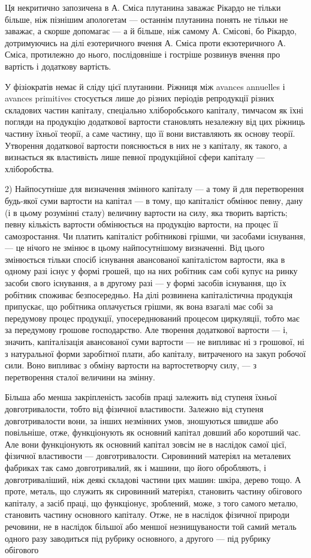 Ця некритично запозичена в А. Сміса плутанина заважає Рікардо
не тільки більше, ніж пізнішим апологетам — останнім плутанина понять
не тільки не заважає, а скорше допомагає — а й більше, ніж самому
А. Смісові, бо Рікардо, дотримуючись на ділі езотеричного вчення
А. Сміса проти екзотеричного А. Сміса, протилежно до нього, послідовніше
і гостріше розвинув вчення про вартість і додаткову вартість.

У фізіократів немає й сліду цієї плутанини. Ріжниця між avances
annuelles і avances primitives стосується лише до різних періодів репродукції
різних складових частин капіталу, спеціально хліборобського капіталу,
тимчасом як їхні погляди на продукцію додаткової вартости становлять
незалежну від цих ріжниць частину їхньої теорії, а саме частину,
що її вони виставляють як основу теорії. Утворення додаткової вартости
пояснюється в них не з капіталу, як такого, а визнається як властивість
лише певної продукційної сфери капіталу — хліборобства.

2) Найпосутніше для визначення змінного капіталу — а тому й для
перетворення будь-якої суми вартости на капітал — в тому, що капіталіст
обмінює певну, дану (і в цьому розумінні сталу) величину вартости на
силу, яка творить вартість; певну кількість вартости обмінюється на продукцію
вартости, на процес її самозростання. Чи платить капіталіст робітникові
грішми, чи засобами існування, — це нічого не змінює в цьому
найпосутнішому визначенні. Від цього змінюється тільки спосіб існування
авансованої капіталістом вартости, яка в одному разі існує у формі грошей,
що на них робітник сам собі купує на ринку засоби свого існування,
а в другому разі — у формі засобів існування, що їх робітник
споживає безпосередньо. На ділі розвинена капіталістична продукція
припускає, що робітника оплачується грішми, як вона взагалі має собі
за передумову процес продукції, упосереднюваний процесом циркуляції,
тобто має за передумову грошове господарство. Але творення додаткової
вартости — і, значить, капіталізація авансованої суми вартости — не випливає
ні з грошової, ні з натуральної форми заробітної плати, або капіталу,
витраченого на закуп робочої сили. Воно випливає з обміну вартости
на вартостетворчу силу, — з перетворення сталої величини на змінну.

Більша або менша закріпленість засобів праці залежить від ступеня
їхньої довготривалости, тобто від фізичної властивости. Залежно від
ступеня довготривалости вони, за інших незмінних умов, зношуються
швидше або повільніше, отже, функціонують як основний капітал довший
або коротший час. Але вони функціонують як основний капітал зовсім
не в наслідок самої цієї, фізичної властивости — довготривалости. Сировинний
матеріял на металевих фабриках так само довготривалий, як і машини,
що його обробляють, і довготриваліший, ніж деякі складові частини цих
машин: шкіра, дерево тощо. А проте, металь, що служить як сировинний
матеріял, становить частину обігового капіталу, а засіб праці, що функціонує,
зроблений, може, з того самого металю, становить частину основного
капіталу. Отже, не в наслідок фізичної природи речовини, не
в наслідок більшої або меншої незнищуваности той самий металь одного
разу заводиться під рубрику основного, а другого — під рубрику обігового
